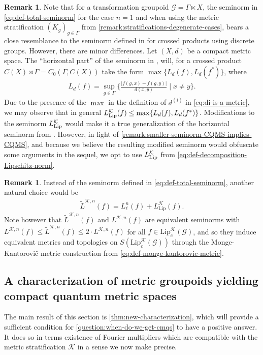 \documentclass[11pt,a4paper,oneside,final,reqno]{amsart}
\theoremstyle{definition}
\newtheorem{remark}[lemma]{Remark}
\newcommand{\G}{\mathcal{G}}
\newcommand{\cK}{\mathcal{K}}
\newcommand{\Lip}{\mathrm{Lip}}
\numberwithin{equation}{section}
\begin{document}
	\begin{remark}\label{remark:metric-strat-vs-transf-gpds}
		Note that for a transformation groupoid $\G = \Gamma \ltimes X $, the seminorm in \eqref{eq:def-total-seminorm} for the case $n=1$ and when using the metric stratification $(K_g)_{g \in \Gamma}$ from \cref{remark:stratifications-degenerate-cases}, 
		bears a close resemblance to the seminorm defined in \cite{AustadKaadKyed2025} for crossed products using discrete groups. 
		However, there are minor differences. Let $(X,d)$ be a compact metric space. The ``horizontal part'' of the seminorm in \cite[Theorem A]{AustadKaadKyed2025}, will, for a crossed product $C(X) \rtimes \Gamma = C_0 (\Gamma , C(X))$ take the form $\max \{ L_d(f) , L_d (f^*)  \}$, where
		\begin{align*}
			L_d (f) = \sup_{g \in \Gamma} \{ \frac{\vert f(g,x) - f(g,y) \vert }{d(x,y)} \mid x \neq y   \} .
		\end{align*}
		Due to the presence of the $\max$ in the definition of $d^{(i)}$ in \eqref{eq:di-is-a-metric}, we may observe that in general $L_{\rm Lip}^{\cK} (f) \leq \max \{ L_d(f) , L_d (f^*)  \}$. Modifications to the seminorm $L_{\rm Lip}^{\cK}$ would make it a true generalization of the horizontal seminorm from \cite{AustadKaadKyed2025}. However, in light of \cref{remark:smaller-seminorm-CQMS-implies-CQMS}, and because we believe the resulting modified seminorm would obfuscate some arguments in the sequel, we opt to use $L^{\cK}_{\rm Lip}$ from \eqref{eq:def-decomposition-Lipschitz-norm}.  
	\end{remark}
	
	\begin{remark}
		Instead of the seminorm defined in \eqref{eq:def-total-seminorm}, another natural choice would be
		\begin{align*}
			\tilde{L}^{\cK,n}(f) = L^n_\ell(f) 
			+ L_{\mathrm{Lip}}^{\cK}(f).
		\end{align*}
		Note however that $\tilde{L}^{\cK,n}(f)$ and $L^{\cK,n}(f)$ are equivalent seminorms with $L^{\cK,n}(f) \leq  \tilde{L}^{\cK,n}(f) \leq 2 \cdot L^{\cK,n}(f)$ for all 
		$f \in \Lip_c^{\cK}(\G)$, 
		and so they induce equivalent metrics and topologies on  
		$S(\Lip_c^{\cK}(\G))$
		through the Monge-Kantorovi\v{c} metric construction from \eqref{eq:def-monge-kantorovic-metric}.
	\end{remark}

	\subsection{A characterization of metric groupoids yielding compact quantum metric spaces}
	The main result of this section is \cref{thm:new-characterization}, which will provide  a sufficient condition for \cref{question:when-do-we-get-cmqs} to have a positive answer. It does so in terms existence of Fourier multipliers which are compatible with the metric stratification $\cK$ in a sense we 
	now make precise.
	
\end{document}
